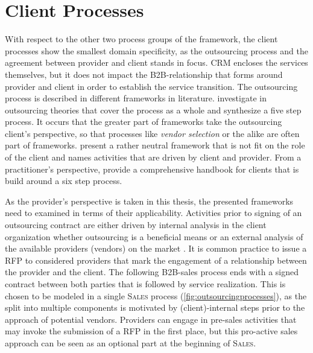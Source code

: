 	\newpage
	
	
	
	
	\section{Client Processes}
	
	With respect to the other two process groups of the framework, the client processes show the smallest domain specificity, as the outsourcing process and the agreement between provider and client stands in focus. \acrshort{CRM} encloses the services themselves, but it does not impact the B2B-relationship that forms around provider and client in order to establish the service transition. 
	The outsourcing process is described in different frameworks in literature. \cite{perunovic2007outsourcing} investigate in outsourcing theories that cover the process as a whole and synthesize a five step process. It occurs that the greater part of frameworks take the outsourcing client's perspective, so that processes like \textit{vendor selection} or the alike are often part of frameworks. \cite{Agarwal_2008} present a rather neutral framework that is not fit on the role of the client and names activities that are driven by client and provider. From a practitioner's perspective, \cite{deloittehandbook} provide a comprehensive handbook for clients that is build around a six step process. 
	
	As the provider's perspective is taken in this thesis, the presented frameworks need to examined in terms of their applicability. Activities prior to signing of an outsourcing contract are either driven by internal analysis in the client organization whether outsourcing is a beneficial means or an external analysis of the available providers (vendors) on the market \citep{Franceschini_2003}. It is common practice to issue a \acrfull{RFP} to considered providers that mark the engagement of a relationship between the provider and the client. The following B2B-sales process ends with a signed contract between both parties that is followed by service realization. This is chosen to be modeled in a single \textsc{Sales} process (\cf \Fig \ref{fig:outsourcingprocesses}), as the split into multiple components is motivated by (client)-internal steps prior to the approach of potential vendors. Providers can engage in pre-sales activities that may invoke the submission of a \acrshort{RFP} in the first place, but this pro-active sales approach can be seen as an optional part at the beginning of \textsc{Sales}.
	
